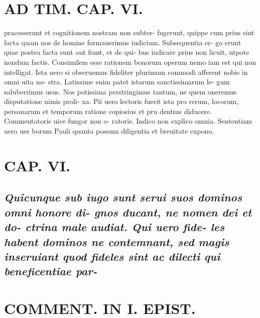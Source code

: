 \documentclass{article}
\begin{document}
\begin{pages}
\section*{AD TIM. CAP. VI. }
\marginpar{[ p.162 ]}\pstart pracesserunt et cognitionem nostram non subter- fugerunt, quippe cum prius sint facta quam nos de homine formauerimus iudicium. Subsequentia er- go erunt quae postea facta sunt aut fiunt, et de qui- bus iudicare prius non licuit, utpote nondum factis. Consimilem esse rationem bonorum operum nemo iam est qui non intelligat. Ista uero si obseruemus fideliter plurimum commodi afferent nobis in omni uita no- stra. Latissime enim patet istarum sanctissimarum le- gum saluberrimus usus. Nos potissima perstringimus tantum, ne quem oneremus disputatione nimis proli- xa. Pii uero lectoris fuerit ista pro rerum, locorum, personarum et temporum ratione copiosius et pru dentius diducere. Commentatoris uice fungor non o- ratoris. Indico non explico omnia. Sententiam uero uer borum Pauli quanta possum diligentia et breuitate expono.  \pend
\endnumbering\beginnumbering\section{CAP. VI.}
{}
\subsection*{\textit{Quicunque sub iugo sunt serui suos dominos omni honore di- gnos ducant, ne nomen dei et do- ctrina male audiat. Qui uero fide- les habent dominos ne contemnant, sed magis inseruiant quod fideles sint ac dilecti qui beneficentiae par- }}
\section*{COMMENT. IN I. EPIST. }
{}

\end{pages}
\end{document}

